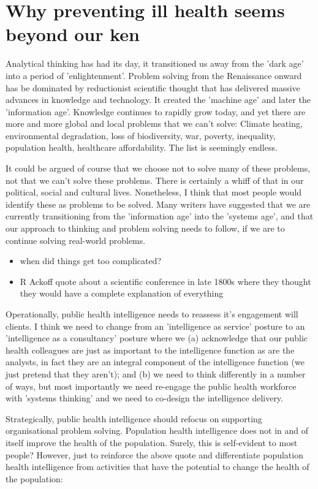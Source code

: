 \section*{Why preventing ill health seems beyond our ken}

Analytical thinking has had its day, it transitioned us away from the 'dark age' into a period of 'enlightenment'. Problem solving from the Renaissance onward has be dominated by reductionist scientific thought that has delivered massive advances in knowledge and technology. It created the 'machine age' and later the 'information age'. Knowledge continues to rapidly grow today, and yet there are more and more global and local problems that we can't solve: Climate heating, environmental degradation, loss of biodiversity, war, poverty, inequality, population health, healthcare affordability. The list is seemingly endless.

It could be argued of course that we choose not to solve many of these problems, not that we can't solve these problems. There is certainly a whiff of that in our political, social and cultural lives. Nonetheless, I think that most people would identify these as problems to be solved. Many writers have suggested that we are currently transitioning from the 'information age' into the 'systems age', and that our approach to thinking and problem solving needs to follow, if we are to continue solving real-world problems.

\begin{itemize}
	\item when did things get too complicated?
	\item R Ackoff quote about a scientific conference in late 1800s where they thought they would have a complete explanation of everything
\end{itemize}

Operationally, public health intelligence needs to reassess it's engagement will clients. I think we need to change from an 'intelligence as service' posture to an 'intelligence as a consultancy' posture where we (a) acknowledge that our public health colleagues are just as important to the intelligence function as are the analysts, in fact they are an integral component of the intelligence function (we just pretend that they aren't); and (b) we need to think differently in a number of ways, but most importantly we need re-engage the public health workforce with 'systems thinking' and we need to co-design the intelligence delivery.

Strategically, public health intelligence should refocus on supporting organisational problem solving. Population health intelligence does not in and of itself improve the health of the population. Surely, this is self-evident to most people? However, just to reinforce the above quote and differentiate population health intelligence from activities that have the potential to change the health of the population: 

